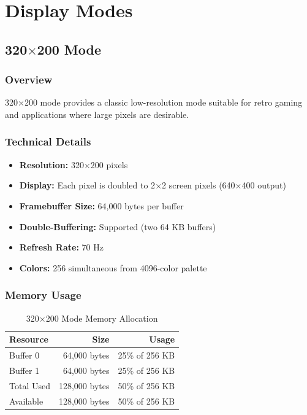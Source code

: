 \documentclass[11pt,letterpaper]{report}
\begin{document}
\chapter{Display Modes}

\section{320$\times$200 Mode}

\subsection{Overview}

320$\times$200 mode provides a classic low-resolution mode suitable for retro gaming and applications where large pixels are desirable.

\subsection{Technical Details}

\begin{itemize}
    \item \textbf{Resolution:} 320$\times$200 pixels
    \item \textbf{Display:} Each pixel is doubled to 2$\times$2 screen pixels (640$\times$400 output)
    \item \textbf{Framebuffer Size:} 64,000 bytes per buffer
    \item \textbf{Double-Buffering:} Supported (two 64 KB buffers)
    \item \textbf{Refresh Rate:} 70 Hz
    \item \textbf{Colors:} 256 simultaneous from 4096-color palette
\end{itemize}

\subsection{Memory Usage}

\begin{table}[tbp]
\centering
\caption{320$\times$200 Mode Memory Allocation}
\label{tab:mem_320}
\begin{tabular}{lrr}
\toprule
\textbf{Resource} & \textbf{Size} & \textbf{Usage} \\
\midrule
Buffer 0 & 64,000 bytes & 25\% of 256 KB \\
Buffer 1 & 64,000 bytes & 25\% of 256 KB \\
Total Used & 128,000 bytes & 50\% of 256 KB \\
Available & 128,000 bytes & 50\% of 256 KB \\
\bottomrule
\end{tabular}
\end{table}
\end{document}
